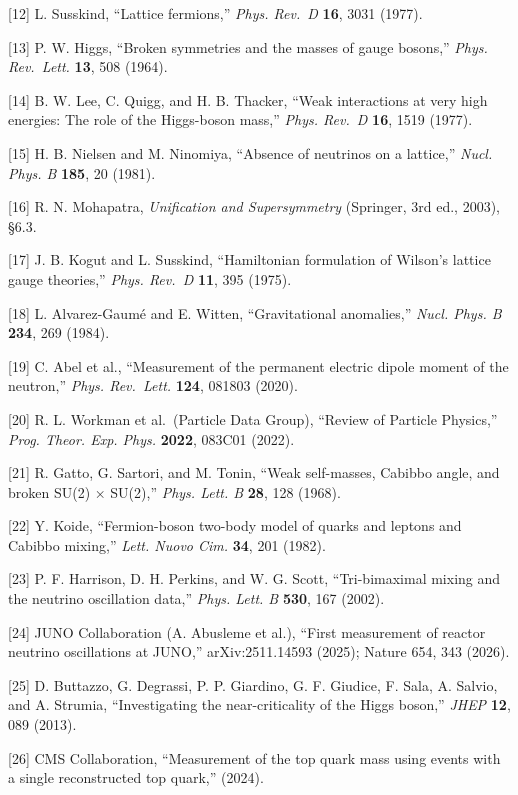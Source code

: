 \documentclass[
]{article}
\begin{document}
{[}12{]} L. Susskind, ``Lattice fermions,'' \emph{Phys. Rev.~D}
\textbf{16}, 3031 (1977).

{[}13{]} P. W. Higgs, ``Broken symmetries and the masses of gauge
bosons,'' \emph{Phys. Rev.~Lett.} \textbf{13}, 508 (1964).

{[}14{]} B. W. Lee, C. Quigg, and H. B. Thacker, ``Weak interactions at
very high energies: The role of the Higgs-boson mass,'' \emph{Phys.
Rev.~D} \textbf{16}, 1519 (1977).

{[}15{]} H. B. Nielsen and M. Ninomiya, ``Absence of neutrinos on a
lattice,'' \emph{Nucl. Phys. B} \textbf{185}, 20 (1981).

{[}16{]} R. N. Mohapatra, \emph{Unification and Supersymmetry}
(Springer, 3rd ed., 2003), §6.3.

{[}17{]} J. B. Kogut and L. Susskind, ``Hamiltonian formulation of
Wilson's lattice gauge theories,'' \emph{Phys. Rev.~D} \textbf{11}, 395
(1975).

{[}18{]} L. Alvarez-Gaumé and E. Witten, ``Gravitational anomalies,''
\emph{Nucl. Phys. B} \textbf{234}, 269 (1984).

{[}19{]} C. Abel et al., ``Measurement of the permanent electric dipole
moment of the neutron,'' \emph{Phys. Rev.~Lett.} \textbf{124}, 081803
(2020).

{[}20{]} R. L. Workman et al.~(Particle Data Group), ``Review of
Particle Physics,'' \emph{Prog. Theor. Exp. Phys.} \textbf{2022}, 083C01
(2022).

{[}21{]} R. Gatto, G. Sartori, and M. Tonin, ``Weak self-masses, Cabibbo
angle, and broken SU(2) × SU(2),'' \emph{Phys. Lett. B} \textbf{28}, 128
(1968).

{[}22{]} Y. Koide, ``Fermion-boson two-body model of quarks and leptons
and Cabibbo mixing,'' \emph{Lett. Nuovo Cim.} \textbf{34}, 201 (1982).

{[}23{]} P. F. Harrison, D. H. Perkins, and W. G. Scott, ``Tri-bimaximal
mixing and the neutrino oscillation data,'' \emph{Phys. Lett. B}
\textbf{530}, 167 (2002).

{[}24{]} JUNO Collaboration (A. Abusleme et al.), ``First measurement of
reactor neutrino oscillations at JUNO,'' arXiv:2511.14593 (2025); Nature
654, 343 (2026).

{[}25{]} D. Buttazzo, G. Degrassi, P. P. Giardino, G. F. Giudice, F.
Sala, A. Salvio, and A. Strumia, ``Investigating the near-criticality of
the Higgs boson,'' \emph{JHEP} \textbf{12}, 089 (2013).

{[}26{]} CMS Collaboration, ``Measurement of the top quark mass using
events with a single reconstructed top quark,'' (2024).
\end{document}
